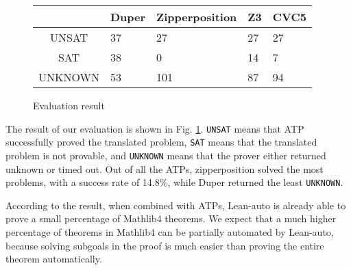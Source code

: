   \begin{figure}
  \begin{center}\begin{tabular}{| c K{6em} K{6em} K{6em} K{6em} |}
    \hline
            & Duper & Zipperposition & Z3 & CVC5 \\ \hline
    UNSAT   & 37    & 27             & 27 & 27   \\
    SAT     & 38    & 0              & 14 & 7    \\
    UNKNOWN & 53    & 101            & 87 & 94   \\ \hline
  \end{tabular}\end{center}
  \caption{Evaluation result} \label{figevalresult}
  \end{figure}

  The result of our evaluation is shown in Fig. \ref{figevalresult}. \texttt{UNSAT} means
  that ATP successfully proved the translated problem, \texttt{SAT} means that
  the translated problem is not provable, and \texttt{UNKNOWN} means that the prover
  either returned unknown or timed out. Out of all the ATPs, zipperposition solved the
  most problems, with a success rate of 14.8\%, while Duper returned the least \texttt{UNKNOWN}.
  
  According to the result, when combined with ATPs, Lean-auto is already able to
  prove a small percentage of Mathlib4 theorems. We expect that a much higher percentage
  of theorems in Mathlib4 can be partially automated by Lean-auto, because solving
  subgoals in the proof is much easier than proving the entire theorem automatically.